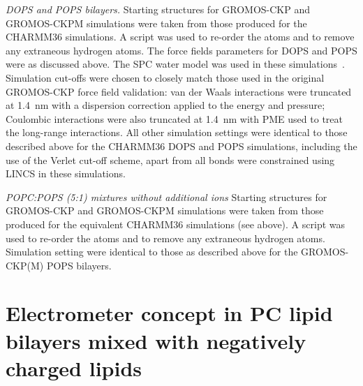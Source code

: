 \documentclass[journal=jpcbfk,manuscript=article]{achemso}
\newcommand{\todo}[1]{\textcolor{red}{#1}}
\begin{document}
\noindent
{\it DOPS and POPS bilayers.} 
Starting structures for GROMOS-CKP and GROMOS-CKPM simulations were taken from those produced for the CHARMM36 simulations.
A script was used to re-order the atoms and to remove any extraneous hydrogen atoms. The force fields parameters for DOPS and POPS
were as discussed above. The SPC water model was used in these simulations~\cite{berendsen81}. Simulation cut-offs were chosen
to closely match those used in the original GROMOS-CKP force field validation: van der Waals interactions were truncated at 1.4~nm
with a dispersion correction applied to the energy and pressure; Coulombic interactions were also truncated at 1.4~nm with PME used
to treat the long-range interactions. All other simulation settings were identical to those described above for the CHARMM36 DOPS
and POPS simulations, including the use of the Verlet cut-off scheme, apart from all bonds were constrained using LINCS in these simulations.


\noindent
{\it POPC:POPS (5:1) mixtures without additional ions}
Starting structures for GROMOS-CKP and GROMOS-CKPM simulations were taken from those produced for the equivalent CHARMM36 simulations (see above).
A script was used to re-order the atoms and to remove any extraneous hydrogen atoms. Simulation setting were identical to those as described above
for the GROMOS-CKP(M) POPS bilayers.



\section{Electrometer concept in PC lipid bilayers mixed with negatively charged lipids}\label{electrometerFORmixtures}
\end{document}
